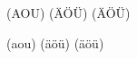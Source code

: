 \documentclass{article}
\begin{document}
\uppercase{(aou) (äöü) (ÄÖÜ)}

\lowercase{(aou) (ÄÖÜ) (äöü)}
\end{document}
